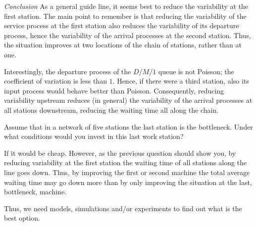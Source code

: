 \emph{Conclusion} As a general guide line, it seems best to reduce the
variability at the first station. The main point to remember is that
reducing the variability of the service process at the first station
also reduces the variability of its departure process, hence the
variability of the arrival processes at the second station. Thus, the
situation improves at two locations of the chain of stations, rather
than at one.

Interestingly, the departure process of the $D/M/1$ queue is not
Poisson; the coefficient of variation is less than $1$. Hence, if
there were a third station, also its input process would behave better
than Poisson. Consequently, reducing variability upstream reduces (in
general) the variability of the arrival processes at all stations
downstream, reducing the waiting time all along the chain. 


\begin{question}
  Assume that in a network of five stations the last station is the
  bottleneck. Under what conditions would you invest in this last
  work station?
  \begin{solution}
    If it would be cheap. However, as the previous question should
    show you, by reducing variability at the first station the waiting
    time of all stations along the line goes down. Thus, by improving
    the first or second machine the total average waiting time may go
    down more than by only improving the situation at the last,
    bottleneck, machine. 

    Thus, we need models, simulations and/or experiments to find out
    what is the best option.
  \end{solution}
\end{question}


